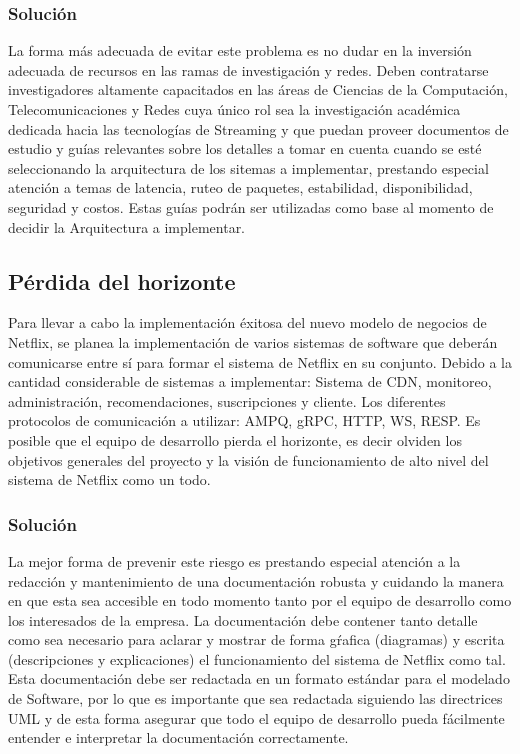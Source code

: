 \documentclass{article}
\begin{document}
\subsubsection{Solución}
La forma más adecuada de evitar este problema es no dudar en la
inversión adecuada de recursos en las ramas de investigación y 
redes. Deben contratarse investigadores altamente capacitados en 
las áreas de Ciencias de la Computación, Telecomunicaciones y 
Redes cuya único rol sea la investigación académica dedicada 
hacia las tecnologías de Streaming y que puedan proveer 
documentos de estudio y guías relevantes sobre los detalles a 
tomar en cuenta cuando 
se esté seleccionando la arquitectura de los sitemas a implementar,
prestando especial atención a temas de latencia, ruteo de paquetes,
estabilidad, disponibilidad, seguridad y costos. Estas guías podrán
ser utilizadas como base al momento de decidir la Arquitectura 
a implementar.

\subsection{Pérdida del horizonte}
Para llevar a cabo la implementación éxitosa del nuevo modelo
de negocios de Netflix, se planea la implementación de varios
sistemas de software que deberán comunicarse entre sí para formar
el sistema de Netflix en su conjunto. Debido a la cantidad
considerable de sistemas a implementar: Sistema de CDN, monitoreo,
administración, recomendaciones, suscripciones y cliente. Los
diferentes protocolos de comunicación a utilizar: AMPQ, gRPC,
HTTP, WS, RESP. Es posible que el equipo de desarrollo pierda 
el horizonte, es decir olviden los objetivos generales del proyecto
y la visión de funcionamiento de alto nivel del sistema de Netflix
como un todo.
\subsubsection{Solución}
La mejor forma de prevenir este riesgo es prestando especial 
atención a la redacción y mantenimiento de una documentación robusta
y cuidando la manera en que esta sea accesible en todo momento
tanto por el equipo de desarrollo como los interesados de la 
empresa. La documentación debe contener tanto detalle como sea 
necesario para aclarar y mostrar de forma gŕafica (diagramas) y 
escrita (descripciones y explicaciones) el funcionamiento del sistema
de Netflix como tal. Esta documentación debe ser redactada en un 
formato estándar para el modelado de Software, por lo que es
importante que sea redactada siguiendo las directrices UML y de esta
forma asegurar que todo el equipo de desarrollo pueda fácilmente 
entender e interpretar la documentación correctamente.
\end{document}
